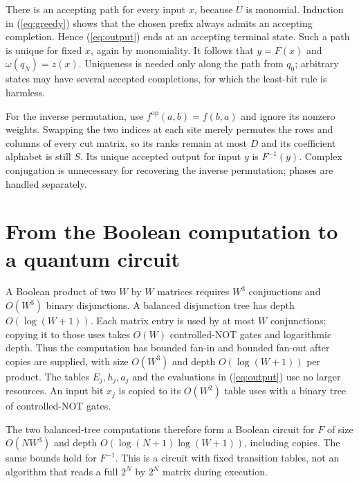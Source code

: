 \documentclass[11pt]{article}
\begin{document}
There is an accepting path for every input $x$, because $U$ is monomial.
Induction in (\ref{eq:greedy}) shows that the chosen prefix always admits
an accepting completion. Hence (\ref{eq:output}) ends at an accepting
terminal state. Such a path is unique for fixed $x$, again by monomiality.
It follows that $y=F(x)$ and $\omega(q_N)=z(x)$.
Uniqueness is needed only along the path from $q_0$; arbitrary states may
have several accepted completions, for which the least-bit rule is harmless.

For the inverse permutation, use $f^{\mathrm{op}}(a,b)=f(b,a)$ and ignore
its nonzero weights. Swapping the two indices at each site merely permutes
the rows and columns of every cut matrix, so its ranks remain at most $D$
and its coefficient alphabet is still $S$. Its unique accepted output for
input $y$ is $F^{-1}(y)$. Complex conjugation is unnecessary for recovering
the inverse permutation; phases are handled separately.

\section{From the Boolean computation to a quantum circuit}

A Boolean product of two $W$ by $W$ matrices requires $W^3$ conjunctions
and $O(W^3)$ binary disjunctions. A balanced disjunction tree has depth
$O(\log(W+1))$. Each matrix entry is used by at most $W$ conjunctions;
copying it to those uses takes $O(W)$ controlled-NOT gates and logarithmic
depth. Thus the computation has bounded fan-in and bounded fan-out after
copies are supplied, with size $O(W^3)$ and depth $O(\log(W+1))$ per product.
The tables $E_j,h_j,a_j$ and the evaluations in (\ref{eq:output}) use no
larger resources. An input bit $x_j$ is copied to its $O(W^2)$ table uses
with a binary tree of controlled-NOT gates.

The two balanced-tree computations therefore form a Boolean circuit for
$F$ of size $O(NW^3)$ and depth
$O(\log(N+1)\log(W+1))$, including copies. The same bounds hold for
$F^{-1}$. This is a circuit with fixed transition tables, not an algorithm
that reads a full $2^N$ by $2^N$ matrix during execution.
\end{document}
